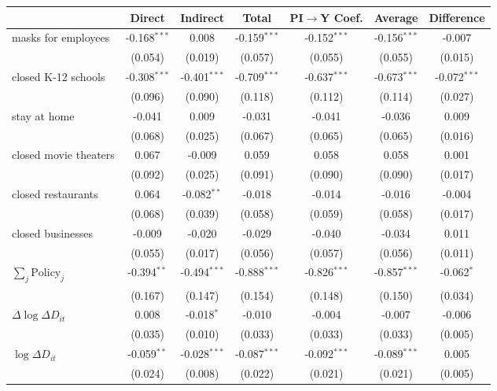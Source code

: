 
\begin{tabular}{lccccc|>{}c}
\toprule
  & Direct & Indirect & Total & PI$\to$Y Coef. & Average & Difference\\
\midrule
masks for employees & -0.168$^{***}$ & 0.008 & -0.159$^{***}$ & -0.152$^{***}$ & -0.156$^{***}$ & -0.007\\
 & (0.054) & (0.019) & (0.057) & (0.055) & (0.055) & (0.015)\\
closed K-12 schools & -0.308$^{***}$ & -0.401$^{***}$ & -0.709$^{***}$ & -0.637$^{***}$ & -0.673$^{***}$ & -0.072$^{***}$\\
 & (0.096) & (0.090) & (0.118) & (0.112) & (0.114) & (0.027)\\
stay at home & -0.041 & 0.009 & -0.031 & -0.041 & -0.036 & 0.009\\
 & (0.068) & (0.025) & (0.067) & (0.065) & (0.065) & (0.016)\\
closed movie theaters & 0.067 & -0.009 & 0.059 & 0.058 & 0.058 & 0.001\\
 & (0.092) & (0.025) & (0.091) & (0.090) & (0.090) & (0.017)\\
closed restaurants & 0.064 & -0.082$^{**}$ & -0.018 & -0.014 & -0.016 & -0.004\\
 & (0.068) & (0.039) & (0.058) & (0.059) & (0.058) & (0.017)\\
closed businesses & -0.009 & -0.020 & -0.029 & -0.040 & -0.034 & 0.011\\
 & (0.055) & (0.017) & (0.056) & (0.057) & (0.056) & (0.011)\\
$\sum_j \mathrm{Policy}_j$ & -0.394$^{**}$ & -0.494$^{***}$ & -0.888$^{***}$ & -0.826$^{***}$ & -0.857$^{***}$ & -0.062$^{*}$\\
 & (0.167) & (0.147) & (0.154) & (0.148) & (0.150) & (0.034)\\
$\Delta \log \Delta D_{it}$ & 0.008 & -0.018$^{*}$ & -0.010 & -0.004 & -0.007 & -0.006\\
 & (0.035) & (0.010) & (0.033) & (0.033) & (0.033) & (0.005)\\
$\log \Delta D_{it}$ & -0.059$^{**}$ & -0.028$^{***}$ & -0.087$^{***}$ & -0.092$^{***}$ & -0.089$^{***}$ & 0.005\\
 & (0.024) & (0.008) & (0.022) & (0.021) & (0.021) & (0.005)\\
\bottomrule
\end{tabular}